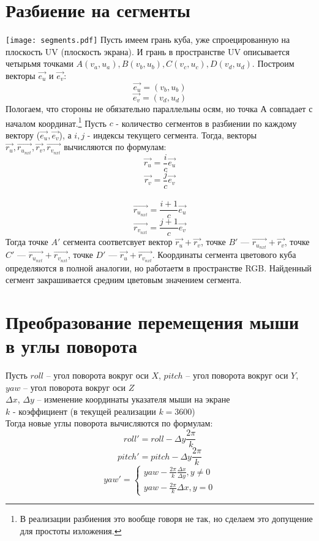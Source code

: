 \documentclass[a4paper,11pt]{article}
\begin{document}
  \section{Разбиение на сегменты}
 
  \texttt{[image: segments.pdf]}
  \linebreak 
   Пусть имеем грань куба, уже спроецированную на плоскость UV (плоскость экрана). И грань в пространстве UV описывается четырьмя точками $A(v_a,u_a), B(v_b,u_b), C(v_c,u_c), D(v_d,u_d)$. Построим векторы $\vec{e_u}$ и $\vec{e_v}$:
   \[ \vec{e_u} =  (v_b,u_b)\]
   \[ \vec{e_v} = (v_d,u_d)\]
   Пологаем, что стороны не обязательно параллельны осям, но точка $А$ совпадает с началом координат.\footnote{В реализации разбиения это вообще говоря не так, но сделаем это допущение для простоты изложения.} Пусть $c$ - количество сегментов в разбиении по каждому вектору ($\vec{e_u}, \vec{e_v}$), а $i,j$ - индексы текущего сегмента. Тогда, векторы $\vec{r_u}, \vec{r_{u_{nxt}}}, \vec{r_v}, \vec{r_{v_{nxt}}}$ вычисляются по формулам:
  \[ \vec{r_u} = \frac{i}{c}\vec{e_u} \]
  \[ \vec{r_v} = \frac{j}{c}\vec{e_v} \]   
   \\
   \[ \vec{r_{u_{nxt}}} = \frac{i+1}{c}\vec{e_u} \]
   \[ \vec{r_{v_{nxt}}} = \frac{j+1}{c}\vec{e_v} \]
Тогда точке $A'$ сегмента соответсвует вектор $\vec{r_u}+\vec{r_v}$, точке $B'$ --- $\vec{r_{u_{nxt}}}+\vec{r_v}$, точке $C'$ --- $\vec{r_{u_{nxt}}}+\vec{r_{v_{nxt}}}$, точке $D'$ --- $\vec{r_u}+\vec{r_{v_{nxt}}}$.
  Координаты сегмента цветового куба определяются в полной аналогии, но работаетм в пространстве RGB. Найденный сегмент закрашивается средним цветовым значением сегмента. 
  
  
  \section{Преобразование перемещения мыши в углы поворота}
  Пусть $roll$ -- угол поворота вокруг оси $X$, $pitch$ -- угол поворота вокруг оси $Y$, $yaw$ -- угол поворота вокруг оси $Z$ \\
  $\varDelta x$, $\varDelta y$ -- изменение координаты указателя мыши на экране \\
  $k$ - коэффициент (в текущей реализации $k  = 3600$) \\
  Тогда новые углы поворота вычисляются по формулам: \\  
  \[ roll' = roll  -\varDelta y\frac{2\pi }{k} \] 
  \[ pitch' = pitch - \varDelta y\frac{2\pi }{k} \]
  \[ yaw' = \begin{cases}
    yaw - \frac{2\pi}{k} \frac{\varDelta x} {\varDelta y}, y\neq 0 \\
    yaw - \frac{2\pi}{k} \varDelta x , y = 0
  \end{cases} \]  
  
\end{document}
